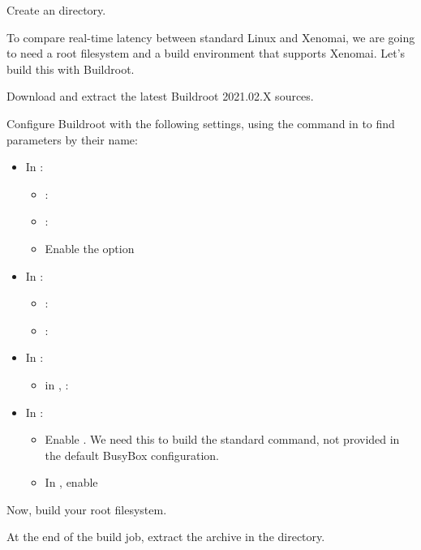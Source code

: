 Create an  directory.

To compare real-time latency between standard Linux and Xenomai, we
are going to need a root filesystem and a build environment that
supports Xenomai. Let's build this with Buildroot.

Download and extract the latest Buildroot 2021.02.X sources.

Configure Buildroot with the following settings,
using the \code{/} command in  to find parameters by their name:

\begin{itemize}
\item In :
   \begin{itemize}
   \item {}: 
   \item {}: 
   \item Enable the  option
   \end{itemize}
\item In :
   \begin{itemize}
   \item {}: 
   \item {}: 
   \end{itemize}
\item In :
   \begin{itemize}
   \item in ,  : 
   \end{itemize}
\item In :
   \begin{itemize}
   \item Enable .
         We need this to build the standard  command, not
         provided in the default BusyBox configuration.
   \item In , enable 
   \end{itemize}
\end{itemize}

Now, build your root filesystem.

At the end of the build job, extract the
 archive in the 
directory.

